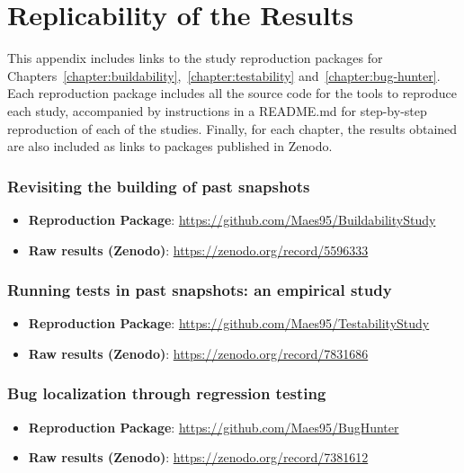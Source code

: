 \chapter{Replicability of the Results}
\label{appendix:replicability}

This appendix includes links to the study reproduction packages for Chapters~\ref{chapter:buildability},~\ref{chapter:testability} and~\ref{chapter:bug-hunter}. 
Each reproduction package includes all the source code for the tools to reproduce each study, accompanied by instructions in a README.md for step-by-step reproduction of each of the studies. 
Finally, for each chapter, the results obtained are also included as links to packages published in Zenodo.

\subsection*{Revisiting the building of past snapshots}
\label{sec:buildability:repro}

\begin{itemize}
    \item \textbf{Reproduction Package}: \url{https://github.com/Maes95/BuildabilityStudy}
    \item \textbf{Raw results (Zenodo)}: \url{https://zenodo.org/record/5596333}
\end{itemize}

\subsection*{Running tests in past snapshots: an empirical study}
\label{sec:testability:repro}

\begin{itemize}
    \item \textbf{Reproduction Package}: \url{https://github.com/Maes95/TestabilityStudy}
    \item \textbf{Raw results (Zenodo)}: \url{https://zenodo.org/record/7831686}
\end{itemize}

\subsection*{Bug localization through regression testing}
\label{sec:bug-hunter:repro}

\begin{itemize}
    \item \textbf{Reproduction Package}: \url{https://github.com/Maes95/BugHunter}
    \item \textbf{Raw results (Zenodo)}: \url{https://zenodo.org/record/7381612}
\end{itemize}